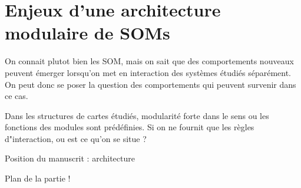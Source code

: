 \section{Enjeux d'une architecture modulaire de SOMs}

On connait plutot bien les SOM, mais on sait que des comportements nouveaux peuvent émerger lorsqu'on met en interaction des systèmes étudiés séparément. 
On peut donc se poser la question des comportements qui peuvent survenir dans ce cas.

Dans les structures de cartes étudiés, modularité forte dans le sens ou les fonctions des modules sont prédéfinies. Si on ne fournit que les règles d"interaction, ou est ce qu'on se situe ? 
 
 
Position du manuscrit : architecture 

Plan de la partie ! 

 

